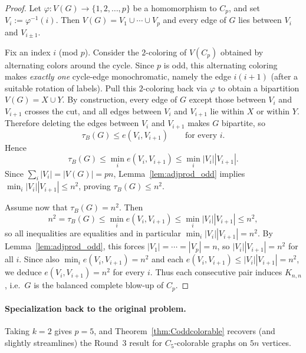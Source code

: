 \begin{proof}
Let $\varphi:V(G)\to \{1,2,\dots,p\}$ be a homomorphism to $C_p$, and set $V_i:=\varphi^{-1}(i)$.
Then $V(G)=V_1\cup\cdots\cup V_p$ and every edge of $G$ lies between $V_i$ and $V_{i\pm 1}$.

Fix an index $i$ (mod $p$).  Consider the $2$-coloring of $V(C_p)$ obtained by alternating
colors around the cycle. Since $p$ is odd, this alternating coloring makes \emph{exactly one}
cycle-edge monochromatic, namely the edge $i(i+1)$ (after a suitable rotation of labels).
Pull this $2$-coloring back via $\varphi$ to obtain a bipartition $V(G)=X\cup Y$.
By construction, every edge of $G$ except those between $V_i$ and $V_{i+1}$ crosses the cut,
and all edges between $V_i$ and $V_{i+1}$ lie within $X$ or within $Y$.
Therefore deleting the edges between $V_i$ and $V_{i+1}$ makes $G$ bipartite, so
\[
\tau_B(G)\le e(V_i,V_{i+1}) \qquad \text{for every } i.
\]
Hence
\[
\tau_B(G)\le \min_i e(V_i,V_{i+1}) \le \min_i |V_i||V_{i+1}|.
\]
Since $\sum_i |V_i|=|V(G)|=pn$, Lemma~\ref{lem:adjprod_odd} implies
$\min_i |V_i||V_{i+1}|\le n^2$, proving $\tau_B(G)\le n^2$.

Assume now that $\tau_B(G)=n^2$.  Then
\[
n^2=\tau_B(G)\le \min_i e(V_i,V_{i+1})\le \min_i |V_i||V_{i+1}|\le n^2,
\]
so all inequalities are equalities and in particular $\min_i |V_i||V_{i+1}|=n^2$.
By Lemma~\ref{lem:adjprod_odd}, this forces $|V_1|=\cdots=|V_p|=n$, so
$|V_i||V_{i+1}|=n^2$ for all $i$.  Since also $\min_i e(V_i,V_{i+1})=n^2$ and each
$e(V_i,V_{i+1})\le |V_i||V_{i+1}|=n^2$, we deduce $e(V_i,V_{i+1})=n^2$ for every $i$.
Thus each consecutive pair induces $K_{n,n}$, i.e.\ $G$ is the balanced complete blow-up of $C_p$.
\end{proof}

\paragraph{Specialization back to the original problem.}
Taking $k=2$ gives $p=5$, and Theorem~\ref{thm:Coddcolorable} recovers (and slightly streamlines)
the Round~3 result for $C_5$-colorable graphs on $5n$ vertices.

